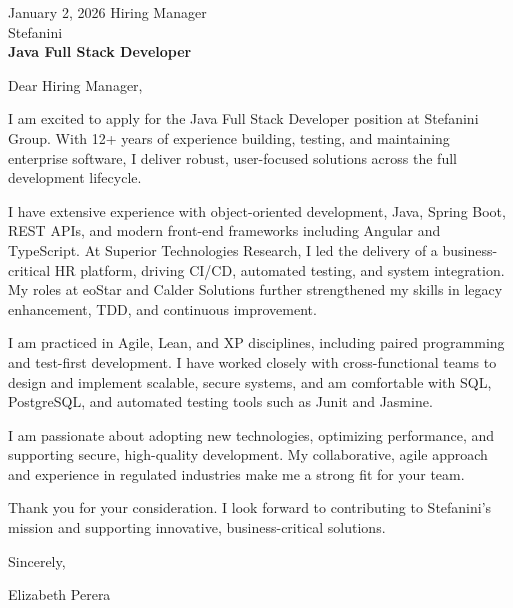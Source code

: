 \documentclass{../styles/coverletter}
\begin{document}
\populatedtitle





January 2, 2026\newline
Hiring Manager\\
Stefanini\\[4pt]
	\textbf{Java Full Stack Developer}\newline


Dear Hiring Manager,\newline


I am excited to apply for the Java Full Stack Developer position at Stefanini Group. With 12+ years of experience building, testing, and maintaining enterprise software, I deliver robust, user-focused solutions across the full development lifecycle.\newline

I have extensive experience with object-oriented development, Java, Spring Boot, REST APIs, and modern front-end frameworks including Angular and TypeScript. At Superior Technologies Research, I led the delivery of a business-critical HR platform, driving CI/CD, automated testing, and system integration. My roles at eoStar and Calder Solutions further strengthened my skills in legacy enhancement, TDD, and continuous improvement.\newline

I am practiced in Agile, Lean, and XP disciplines, including paired programming and test-first development. I have worked closely with cross-functional teams to design and implement scalable, secure systems, and am comfortable with SQL, PostgreSQL, and automated testing tools such as Junit and Jasmine.\newline

I am passionate about adopting new technologies, optimizing performance, and supporting secure, high-quality development. My collaborative, agile approach and experience in regulated industries make me a strong fit for your team.\newline

Thank you for your consideration. I look forward to contributing to Stefanini's mission and supporting innovative, business-critical solutions.\newline



Sincerely,\newline

Elizabeth Perera
\end{document}
